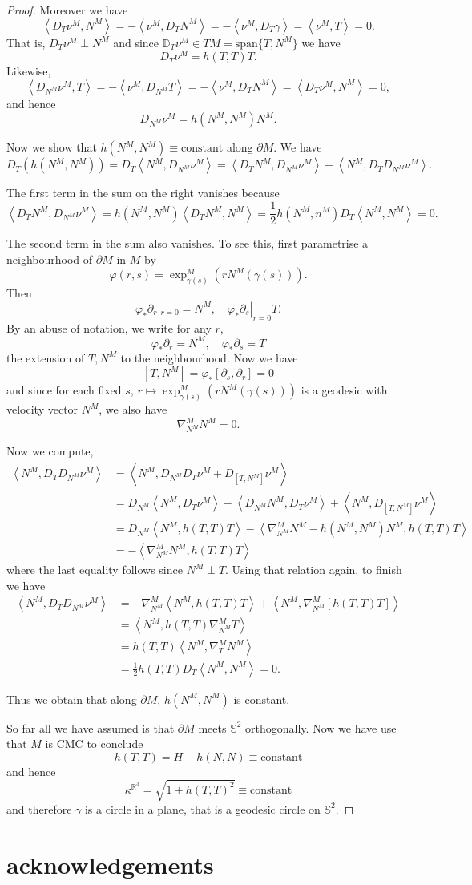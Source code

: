\documentclass[10pt]{amsart}
\newcommand{\IP}[2]{\left< #1 , #2 \right>}
\newcommand{\R}{\ensuremath{\mathbb{R}}}
\newcommand{\D}{\ensuremath{\mathbb{D}}}
\renewcommand{\S}{\ensuremath{\mathbb{S}}}
\theoremstyle{remark}
\begin{document}
\begin{proof}
Moreover we have
\[
\IP{D_T \nu^M}{N^M} = - \IP{\nu^M}{D_T N^M} = -\IP{\nu^M}{D_T \gamma} = \IP{\nu^M}{T} = 0.
\]
That is, \(D_T \nu^M \perp N^M\) and since \(\D_T \nu^M \in TM = \text{span} \{T, N^M\}\) we have
\[
D_T \nu^M = h(T, T) T.
\]
Likewise,
\[
\IP{D_{N^M} \nu^M}{T} = -\IP{\nu^M}{D_{N^M} T} = -\IP{\nu^M}{D_T N^M} = \IP{D_T \nu^M}{N^M} = 0,
\]
and hence
\[
D_{N^M} \nu^M = h(N^M, N^M) N^M.
\]

Now we show that \(h(N^M, N^M) \equiv \text{constant}\) along \(\partial M\). We have
\[
D_T \left(h(N^M, N^M)\right) = D_T \IP{N^M}{D_{N^M} \nu^M} = \IP{D_T N^M}{D_{N^M} \nu^M} + \IP{N^M}{D_T D_{N^M} \nu^M}.
\]

The first term in the sum on the right vanishes because
\[
\IP{D_T N^M}{D_{N^M} \nu^M} = h(N^M, N^M) \IP{D_T N^M}{N^M} = \frac{1}{2} h(N^M, n^M) D_T \IP{N^M}{N^M} = 0.
\]

The second term in the sum also vanishes. To see this, first parametrise a neighbourhood of \(\partial M\) in \(M\) by
\[
\varphi(r, s) = \exp^M_{\gamma(s)} (r N^M(\gamma(s))).
\]
Then
\[
\varphi_{\ast} \partial_r |_{r=0} = N^M, \quad \varphi_{\ast} \partial_s |_{r=0} T.
\]
By an abuse of notation, we write for any \(r\),
\[
\varphi_{\ast} \partial_r = N^M, \quad \varphi_{\ast} \partial_s = T
\]
the extension of \(T, N^M\) to the neighbourhood. Now we have
\[
[T, N^M] = \varphi_{\ast} [\partial_s, \partial_r] = 0
\]
and since for each fixed \(s\), \(r \mapsto \exp^M_{\gamma(s)} (rN^M(\gamma(s)))\) is a geodesic with velocity vector \(N^M\), we also have
\[
\nabla^M_{N^M} N^M = 0.
\]

Now we compute,
\[
\begin{split}
\IP{N^M}{D_T D_{N^M} \nu^M} &= \IP{N^M}{D_{N^M} D_T \nu^M + D_{[T, N^M]} \nu^M} \\
&= D_{N^M} \IP{N^M}{D_T \nu^M} - \IP{D_{N^M} N^M}{D_T \nu^M} + \IP{N^M}{D_{[T, N^M]} \nu^M} \\
&= D_{N^M} \IP{N^M}{h(T, T) T} - \IP{\nabla^M_{N^M} N^M - h(N^M, N^M) N^M}{h(T, T) T} \\
&= -\IP{\nabla^M_{N^M} N^M}{h(T, T) T} 
\end{split}
\]
where the last equality follows since \(N^M \perp T\). Using that relation again, to finish we have
\[
\begin{split}
\IP{N^M}{D_T D_{N^M} \nu^M} &= -\nabla^M_{N^M} \IP{N^M}{h(T, T) T} + \IP{N^M}{\nabla^M_{N^M} [h(T, T) T]} \\
&= \IP{N^M}{h(T, T) \nabla^M_{N^M} T} \\
&= h(T, T) \IP{N^M}{\nabla^M_T N^M} \\
&= \frac{1}{2} h(T, T) D_T \IP{N^M}{N^M} = 0.
\end{split}
\]

Thus we obtain that along \(\partial M\), \(h(N^M, N^M)\) is constant.

So far all we have assumed is that \(\partial M\) meets \(\S^2\) orthogonally. Now we have use that \(M\) is CMC to conclude
\[
h(T, T) = H - h(N, N) \equiv \text{constant}
\]
and hence
\[
\kappa^{\R^3} = \sqrt{1 + h(T, T)^2} \equiv \text{constant}
\]
and therefore \(\gamma\) is a circle in a plane, that is a geodesic circle on \(\S^2\).
\end{proof}

\section*{acknowledgements}



\end{document}
